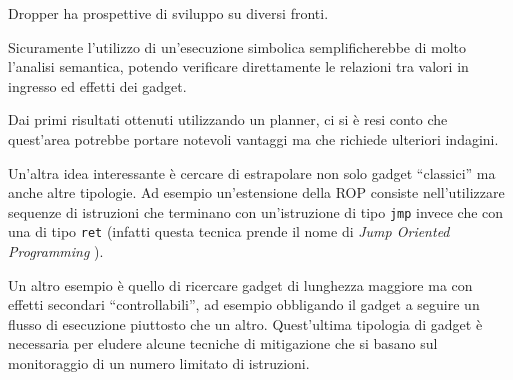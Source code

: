 Dropper ha prospettive di sviluppo su diversi fronti. 

Sicuramente l'utilizzo di un'esecuzione simbolica semplificherebbe di
molto l'analisi semantica, potendo verificare direttamente le
relazioni tra valori in ingresso ed effetti dei gadget.

Dai primi risultati ottenuti utilizzando un planner,  ci si è resi
conto che quest'area potrebbe portare notevoli vantaggi ma che
richiede ulteriori indagini.

Un'altra idea interessante è cercare di estrapolare non solo gadget
``classici'' ma anche altre tipologie. Ad esempio un'estensione della
ROP consiste nell'utilizzare sequenze di istruzioni che terminano con
un'istruzione di tipo \lstinline{jmp} invece che con una di tipo
\lstinline{ret} (infatti questa tecnica prende il nome di \emph{Jump
  Oriented Programming} \cite{Checkoway-10}).

Un altro esempio è quello di ricercare gadget di lunghezza maggiore ma
con effetti secondari ``controllabili'', ad esempio obbligando il
gadget a seguire un flusso di esecuzione piuttosto che
un altro. Quest'ultima tipologia di gadget è necessaria per eludere
alcune tecniche di mitigazione che si basano sul monitoraggio di un
numero limitato di istruzioni.

